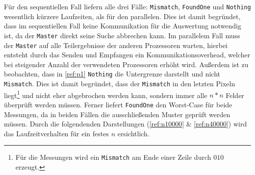 Für den sequentiellen Fall liefern alle drei Fälle: \texttt{Mismatch}, \texttt{FoundOne} und \texttt{Nothing} wesentlich kürzere Laufzeiten, als für den parallelen. 
Dies ist damit begründet, dass im sequentiellen Fall keine Kommunikation für die Auswertung notwendig ist, da der \texttt{Master} direkt seine Suche abbrechen kann. 
Im parallelem Fall muss der \texttt{Master} auf alle Teilergebnisse der anderen Prozessoren warten, hierbei entsteht durch das Senden und Empfangen ein Kommunikationsoverhead, welcher bei steigender Anzahl der verwendeten Prozessoren erhöht wird.
Außerdem ist zu beobachten, dass in \autoref{ref:p1} \texttt{Nothing} die Untergrenze darstellt und nicht \texttt{Mismatch}. Dies ist damit begründet, dass der \texttt{Mismatch} in den letzten Pixeln liegt\footnote{Für die Messungen wird ein \texttt{Mismatch} am Ende einer Zeile durch $0 1 0$ erzeugt.} und nicht eher abgebrochen werden kann, sondern immer alle $n*n$ Felder überprüft werden müssen. Ferner liefert \texttt{FoundOne} den Worst-Case für beide Messungen, da in beiden Fällen die ausschließenden Muster geprüft werden müssen. 
Durch die folgendenden Darstellungen (\autoref{ref:n10000} \& \autoref{ref:n40000}) wird das Laufzeitverhalten für ein festes $n$ ersichtlich.

